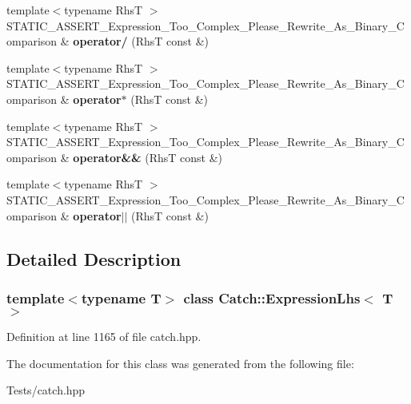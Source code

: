 \begin{DoxyCompactItemize}
\mbox{\label{class_catch_1_1_expression_lhs_a37d50565046ac9b1c9159a7c0cf88a1e}} 
{\footnotesize template$<$typename RhsT $>$ }\\S\+T\+A\+T\+I\+C\+\_\+\+A\+S\+S\+E\+R\+T\+\_\+\+Expression\+\_\+\+Too\+\_\+\+Complex\+\_\+\+Please\+\_\+\+Rewrite\+\_\+\+As\+\_\+\+Binary\+\_\+\+Comparison \& {\bfseries operator/} (RhsT const \&)
\item 
\mbox{\label{class_catch_1_1_expression_lhs_a9a94294c22449f62087862ef911e6291}} 
{\footnotesize template$<$typename RhsT $>$ }\\S\+T\+A\+T\+I\+C\+\_\+\+A\+S\+S\+E\+R\+T\+\_\+\+Expression\+\_\+\+Too\+\_\+\+Complex\+\_\+\+Please\+\_\+\+Rewrite\+\_\+\+As\+\_\+\+Binary\+\_\+\+Comparison \& {\bfseries operator$\ast$} (RhsT const \&)
\item 
\mbox{\label{class_catch_1_1_expression_lhs_acbda1f937f8bd5b9da649626cc0b0f54}} 
{\footnotesize template$<$typename RhsT $>$ }\\S\+T\+A\+T\+I\+C\+\_\+\+A\+S\+S\+E\+R\+T\+\_\+\+Expression\+\_\+\+Too\+\_\+\+Complex\+\_\+\+Please\+\_\+\+Rewrite\+\_\+\+As\+\_\+\+Binary\+\_\+\+Comparison \& {\bfseries operator\&\&} (RhsT const \&)
\item 
\mbox{\label{class_catch_1_1_expression_lhs_a6932b72da79d6c6b03d867772ceac61b}} 
{\footnotesize template$<$typename RhsT $>$ }\\S\+T\+A\+T\+I\+C\+\_\+\+A\+S\+S\+E\+R\+T\+\_\+\+Expression\+\_\+\+Too\+\_\+\+Complex\+\_\+\+Please\+\_\+\+Rewrite\+\_\+\+As\+\_\+\+Binary\+\_\+\+Comparison \& {\bfseries operator$\vert$$\vert$} (RhsT const \&)
\end{DoxyCompactItemize}


\subsection{Detailed Description}
\subsubsection*{template$<$typename T$>$\newline
class Catch\+::\+Expression\+Lhs$<$ T $>$}



Definition at line 1165 of file catch.\+hpp.



The documentation for this class was generated from the following file\+:\begin{DoxyCompactItemize}
\item 
Tests/catch.\+hpp\end{DoxyCompactItemize}
